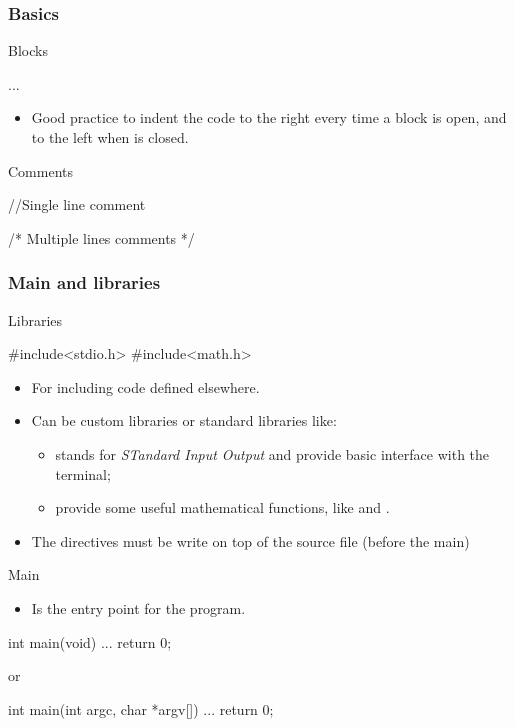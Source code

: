 \begin{frame}[fragile]
  \frametitle{Basics}
  \begin{block}{Blocks}
    \begin{cblock}
{
  ...
}
    \end{cblock}
    \begin{itemize}
    \item Good practice to \alert{indent} the code to the right every
      time a block is open, and to the left when is closed.
    \end{itemize}
  \end{block}
  \begin{block}{Comments}
    \begin{cblock}
//Single line comment

/* Multiple
lines
comments */
    \end{cblock}
  \end{block}
\end{frame}

\begin{frame}[fragile]
  \frametitle{Main and libraries}
  \begin{block}{Libraries}
    \begin{cblock}
#include<stdio.h>
#include<math.h>      
    \end{cblock}
    \begin{itemize}
    \item For including code defined elsewhere.
    \item Can be custom libraries or standard libraries like:
      \begin{itemize}
      \item {} stands for \emph{STandard Input Output} and
        provide basic interface with the terminal;
      \item {} provide some useful mathematical functions,
        like  and .
      \end{itemize}
    \item The  directives must be write on top of the
      source file (before the main)
    \end{itemize}
  \end{block}
\end{frame}

\begin{frame}[fragile]
  \begin{block}{Main}
    \begin{itemize}
    \item Is the entry point for the program.
    \end{itemize}
    \begin{cblock}
int main(void) {
  ...
  return 0;
}
    \end{cblock}
    or
    \begin{cblock}
int main(int argc, char *argv[]) {
  ...
  return 0;
}
    \end{cblock}
  \end{block}
\end{frame}

